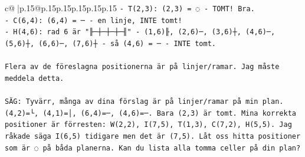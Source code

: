 \documentclass{article}
\begin{document}
{\begin{supertabular}{c@{$\;$}|p{.15\linewidth}@{}p{.15\linewidth}p{.15\linewidth}p{.15\linewidth}p{.15\linewidth}p{.15\linewidth}}
{{{\texttt{{-} T(2,3): (2,3) = ◌ {-} TOMT! Bra.} \\
\texttt{{-} C(6,4): (6,4) = ─ {-} en linje, INTE tomt!} \\
\texttt{{-} H(4,6): rad 6 är "╟─┼─┼─┼─╢" {-} (1,6)╟, (2,6)─, (3,6)┼, (4,6)─, (5,6)┼, (6,6)─, (7,6)┼ {-} så (4,6) = ─ {-} INTE tomt.} \\
\\ 
\texttt{Flera av de föreslagna positionerna är på linjer/ramar. Jag måste meddela detta.} \\
\\ 
\texttt{SÄG: Tyvärr, många av dina förslag är på linjer/ramar på min plan. (4,2)=└, (4,1)=│, (6,4)=─, (4,6)=─. Bara (2,3) är tomt. Mina korrekta positioner är förresten: W(2,2), I(7,5), T(1,3), C(7,2), H(5,5). Jag råkade säga I(6,5) tidigare men det är (7,5). Låt oss hitta positioner som är ◌ på båda planerna. Kan du lista alla tomma celler på din plan?} \\
            }
        }
    }
     \\ \\


\end{supertabular}}
\end{document}
